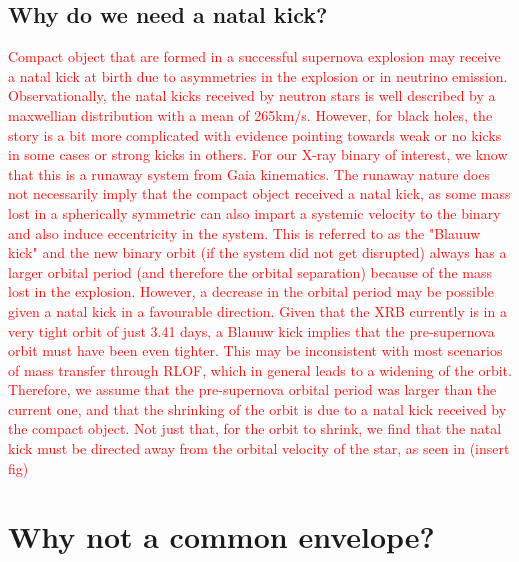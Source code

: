 \documentclass[linenumbers,trackchanges,twocolumn]{aastex701}
\newcommand{\red}{\textcolor{red}}
\begin{document}
\subsection{Why do we need a natal kick?}

\red{Compact object that are formed in a successful supernova explosion may receive a natal kick at birth due to asymmetries in the explosion or in neutrino emission. Observationally, the natal kicks received by neutron stars is well described by a maxwellian distribution with a mean of 265km/s. However, for black holes, the story is a bit more complicated with evidence pointing towards weak or no kicks in some cases or strong kicks in others. For our X-ray binary of interest, we know that this is a runaway system from Gaia kinematics. The runaway nature does not necessarily imply that the compact object received a natal kick, as some mass lost in a spherically symmetric can also impart a systemic velocity to the binary and also induce eccentricity in the system. This is referred to as the "Blauuw kick" and the new binary orbit (if the system did not get disrupted) always has a larger orbital period (and therefore the orbital separation) because of the mass lost in the explosion. However, a decrease in the orbital period may be possible given a natal kick in a favourable direction. Given that the XRB currently is in a very tight orbit of just 3.41 days, a Blauuw kick implies that the pre-supernova orbit must have been even tighter. This may be inconsistent with most scenarios of mass transfer through RLOF, which in general leads to a widening of the orbit. Therefore, we assume that the pre-supernova orbital period was larger than the current one, and that the shrinking of the orbit is due to a natal kick received by the compact object. Not just that, for the orbit to shrink, we find that the natal kick must be directed away from the orbital velocity of the star, as seen in (insert fig)}

\section{Why not a common envelope?}
\end{document}
